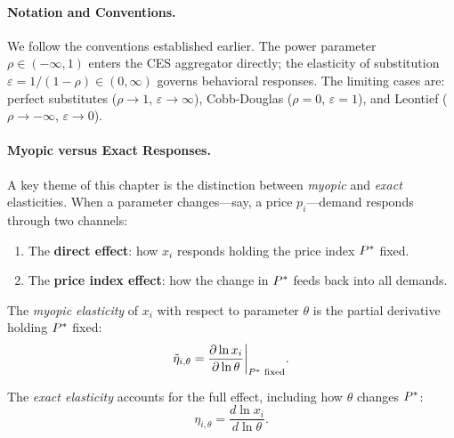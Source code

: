 \paragraph{Notation and Conventions.}

We follow the conventions established earlier. The power parameter $\rho \in (-\infty, 1)$ enters the CES aggregator directly; the elasticity of substitution $\varepsilon = 1/(1-\rho) \in (0, \infty)$ governs behavioral responses. The limiting cases are: perfect substitutes ($\rho \to 1$, $\varepsilon \to \infty$), Cobb-Douglas ($\rho = 0$, $\varepsilon = 1$), and Leontief ($\rho \to -\infty$, $\varepsilon \to 0$).

\paragraph{Myopic versus Exact Responses.}

A key theme of this chapter is the distinction between \emph{myopic} and \emph{exact} elasticities. When a parameter changes---say, a price $p_i$---demand responds through two channels:
\begin{enumerate}[label=(\roman*), nosep]
    \item The \textbf{direct effect}: how $x_i$ responds holding the price index $P^{*}$ fixed.
    \item The \textbf{price index effect}: how the change in $P^{*}$ feeds back into all demands.
\end{enumerate}

\begin{definition}
\label{def:myopic}
The \emph{myopic elasticity} of $x_i$ with respect to parameter $\theta$ is the partial derivative holding $P^{*}$ fixed:
\begin{equation}
\tilde{\eta}_{i,\theta} = \frac{\partial \ln x_i}{\partial \ln \theta} \bigg|_{P^{*} \text{ fixed}}.
\end{equation}
\end{definition}

\begin{definition}
\label{def:exact}
The \emph{exact elasticity} accounts for the full effect, including how $\theta$ changes $P^{*}$:
\begin{equation}
\eta_{i,\theta} = \frac{d \ln x_i}{d \ln \theta}.
\end{equation}
\end{definition}

